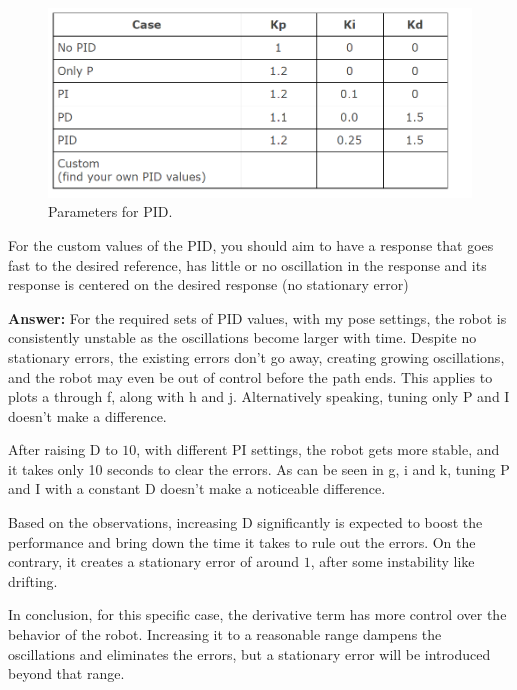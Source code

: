 \documentclass[12pt]{article}
\begin{document}
\begin{enumerate}
    \begin{figure}[H]
        \centering\includegraphics[width=14cm]{images/pidparameter.png}\vspace{-10pt}
        \caption{Parameters for PID.}
        \label{fig:pid_2}
        \vspace{-2ex}
    \end{figure}
    
    For the custom values of the PID, you should aim to have a response that goes fast to the desired reference, has little or no oscillation in the response and its response is centered on the desired response (no stationary error)

    \textbf{Answer: }For the required sets of PID values, with my pose settings, the robot is consistently unstable as the oscillations become larger with time. Despite no stationary errors, the existing errors don't go away, creating growing oscillations, and the robot may even be out of control before the path ends. This applies to plots a through f, along with h and j. Alternatively speaking, tuning only P and I doesn't make a difference.
    
    After raising D to $10$, with different PI settings, the robot gets more stable, and it takes only 10 seconds to clear the errors. As can be seen in g, i and k, tuning P and I with a constant D doesn't make a noticeable difference.

    Based on the observations, increasing D significantly is expected to boost the performance and bring down the time it takes to rule out the errors. On the contrary, it creates a stationary error of around $1$, after some instability like drifting.

    In conclusion, for this specific case, the derivative term has more control over the behavior of the robot. Increasing it to a reasonable range dampens the oscillations and eliminates the errors, but a stationary error will be introduced beyond that range.
    

\end{enumerate}
\end{document}

